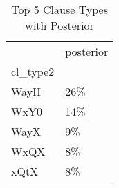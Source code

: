 \begin{table}[htbp!]
\centering
\caption{Top 5 Clause Types with Posterior}
\label{table:post_pr_top5}
\begin{tabular}{ll}
\toprule
{} & posterior \\
cl\_type2 &           \\
\midrule
WayH     &       26\% \\
WxY0     &       14\% \\
WayX     &        9\% \\
WxQX     &        8\% \\
xQtX     &        8\% \\
\bottomrule
\end{tabular}
\end{table}
